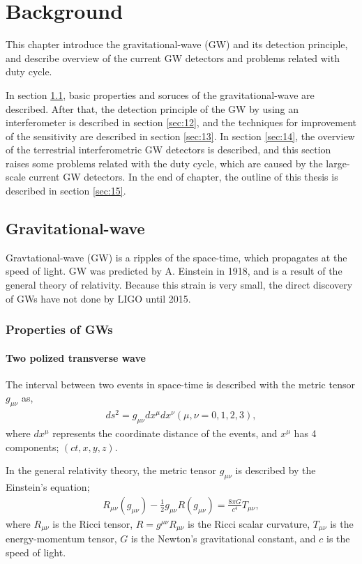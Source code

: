 \chapter{Background} \label{chap1}
This chapter introduce the gravitational-wave (GW) and its detection principle, and describe overview of the current GW detectors and problems related with duty cycle.

In section \cref{sec:11}, basic properties and soruces of the gravitational-wave are described. After that, the detection principle of the GW by using an interferometer is described in section \cref{sec:12}, and the techniques for improvement of the sensitivity are described in section \cref{sec:13}. In section \cref{sec:14}, the overview of the terrestrial interferometric GW detectors is described, and this section raises some problems related with the duty cycle, which are caused by the large-scale current GW detectors. In the end of chapter, the outline of this thesis is described in section \cref{sec:15}.

\section{Gravitational-wave} \label{sec:11}
Gravtational-wave (GW) is a ripples of the space-time, which propagates at the speed of light. GW was predicted by A. Einstein in 1918, and is a result of the general theory of relativity. Because this strain is very small, the direct discovery of GWs have not done by LIGO until 2015.

\subsection{Properties of GWs} 
\subsubsection{Two polized transverse wave}
The interval between two events in space-time is
described with the metric tensor $g_{\mu\nu}$ as, 
\begin{eqnarray}
  d s^{2}=g_{\mu \nu} d x^{\mu} d x^{\nu} (\mu,\nu = 0,1,2,3),
\end{eqnarray}
where $dx^{\mu}$ represents the coordinate distance of the events, and $x^{\mu}$ has 4 components; $(ct,x,y,z)$.

In the general relativity theory\cite{einstein1916vd}, the metric tensor $g_{\mu\nu}$ is described by the Einstein's equation;
\begin{eqnarray}
  R_{\mu \nu}\left(g_{\mu \nu}\right)-\frac{1}{2} g_{\mu \nu} R\left(g_{\mu \nu}\right)=\frac{8 \pi G}{c^{4}} T_{\mu \nu},
\end{eqnarray}
where $R_{\mu\nu}$ is the Ricci tensor, $R=g^{\mu \nu} R_{\mu \nu}$ is the Ricci scalar curvature, $T_{\mu\nu}$ is the energy-momentum tensor, $G$ is the Newton's gravitational constant, and $c$ is the speed of light.

